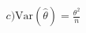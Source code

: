 \documentclass[preview]{standalone}
\begin{document}
\begin{align*}
c) \text{Var}(\hat{\theta}) = \frac{\theta^2}{n}
\end{align*}
\end{document}

